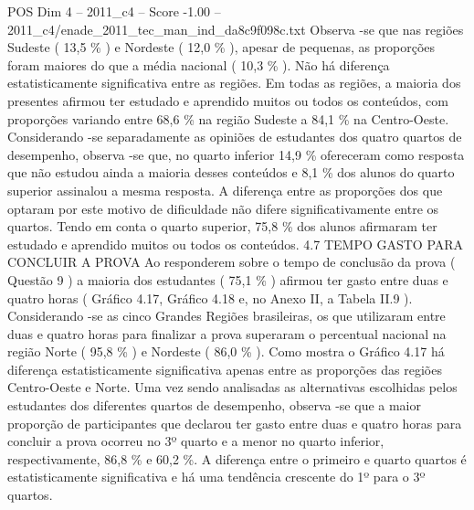 \begin{textsample}{POS Dim 4 – 2011\_c4 – Score -1.00 – 2011\_c4/enade\_2011\_tec\_man\_ind\_da8c9f098c.txt}
Observa -se que nas regiões Sudeste ( 13,5 \% ) e Nordeste ( 12,0 \% ), apesar de pequenas, as proporções foram maiores do que a média nacional ( 10,3 \% ).
Não há diferença estatisticamente significativa entre as regiões.
Em todas as regiões, a maioria dos presentes afirmou ter estudado e aprendido muitos ou todos os conteúdos, com proporções variando entre 68,6 \% na região Sudeste a 84,1 \% na Centro-Oeste.
Considerando -se separadamente as opiniões de estudantes dos quatro quartos de desempenho, observa -se que, no quarto inferior 14,9 \% ofereceram como resposta que não estudou ainda a maioria desses conteúdos e 8,1 \% dos alunos do quarto superior assinalou a mesma resposta.
A diferença entre as proporções dos que optaram por este motivo de dificuldade não difere significativamente entre os quartos.
Tendo em conta o quarto superior, 75,8 \% dos alunos afirmaram ter estudado e aprendido muitos ou todos os conteúdos. 4.7 TEMPO GASTO PARA CONCLUIR A PROVA Ao responderem sobre o tempo de conclusão da prova ( Questão 9 ) a maioria dos estudantes ( 75,1 \% ) afirmou ter gasto entre duas e quatro horas ( Gráfico 4.17, Gráfico 4.18 e, no Anexo II, a Tabela II.9 ).
Considerando -se as cinco Grandes Regiões brasileiras, os que utilizaram entre duas e quatro horas para finalizar a prova superaram o percentual nacional na região Norte ( 95,8 \% ) e Nordeste ( 86,0 \% ).
Como mostra o Gráfico 4.17 há diferença estatisticamente significativa apenas entre as proporções das regiões Centro-Oeste e Norte.
Uma vez sendo analisadas as alternativas escolhidas pelos estudantes dos diferentes quartos de desempenho, observa -se que a maior proporção de participantes que declarou ter gasto entre duas e quatro horas para concluir a prova ocorreu no 3º quarto e a menor no quarto inferior, respectivamente, 86,8 \% e 60,2 \%.
A diferença entre o primeiro e quarto quartos é estatisticamente significativa e há uma tendência crescente do 1º para o 3º quartos.

\end{textsample}
